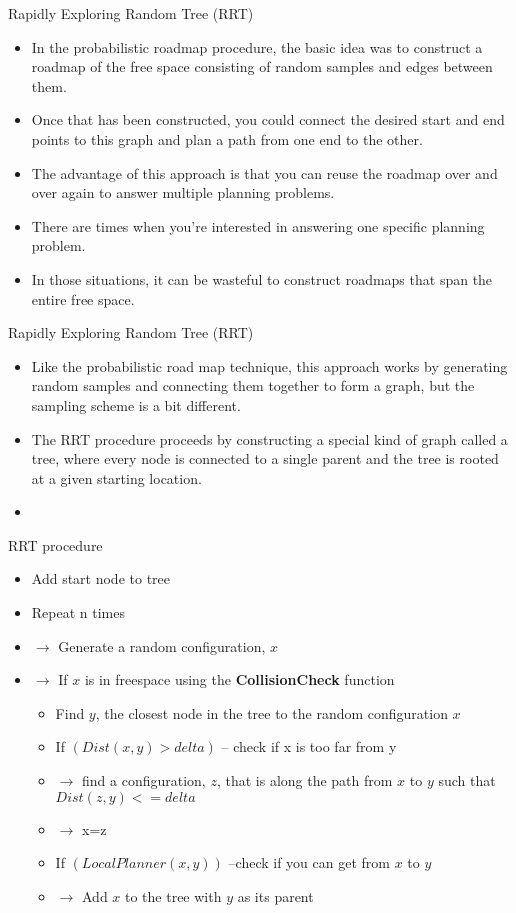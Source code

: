 \documentclass[10pt,mathserif]{beamer}
\begin{document}
\begin{frame}{Rapidly Exploring Random Tree (RRT)}
\begin{itemize}
\item In the probabilistic roadmap procedure, the basic idea was to construct a roadmap of the 
free space consisting of random samples and edges between them.
\item Once that has been constructed, you could connect the desired start and end points to this graph
and plan a path from one end to the other.
\item The advantage of this approach is that you can reuse the roadmap over and over again to answer 
multiple planning problems.
\item There are times when you're interested in answering one specific planning problem.
\item In those situations, it can be wasteful to construct roadmaps that span the entire free space.
\end{itemize}
\end{frame}

\begin{frame}{Rapidly Exploring Random Tree (RRT)}
\begin{itemize}
\item Like the probabilistic road map technique, this approach works by generating random samples and
connecting them together to form a graph, but the sampling scheme is a bit different.
\item The RRT procedure proceeds by constructing a special kind of graph called a tree, where every 
node is connected to a single parent and the tree is rooted at a given starting location.
\item 
\end{itemize}
\end{frame}

\begin{frame}{RRT procedure}
\begin{itemize}
\item Add start node to tree
\item Repeat n times 
\item $\rightarrow$ Generate a random configuration, $x$
\item $\rightarrow$ If $x$ is in freespace using the \textbf{CollisionCheck} function
\begin{itemize}
\item Find $y$, the closest node in the tree to the random configuration $x$
\item If $(Dist(x,y) > delta)$  -- check if x is too far from y
\item $\rightarrow$ find a configuration, $z$, that is along the path from $x$ to $y$ such 
that $Dist(z,y) <= delta$
\item $\rightarrow$ x=z
\item If $(LocalPlanner(x,y))$  --check if you can get from $x$ to $y$
\item $\rightarrow$ Add $x$ to the tree with $y$ as its parent 
\end{itemize}
\end{itemize}
\end{frame}
\end{document}
